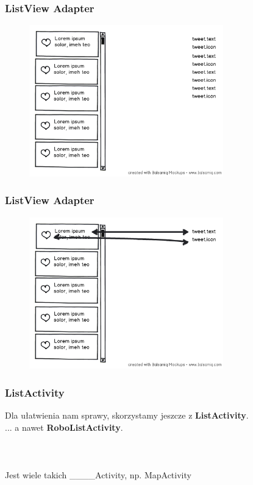 \begin{frame}\frametitle{ListView Adapter}
\begin{figure}
 \centering
 \includegraphics[width=0.75\textwidth]{images/adapter_1}
\end{figure}
\end{frame}

\begin{frame}\frametitle{ListView Adapter}
\begin{figure}
 \centering
 \includegraphics[width=0.75\textwidth]{images/adapter_2}
\end{figure}
\end{frame}

\begin{frame}\frametitle{ListActivity}
\begin{center}
 Dla ułatwienia nam sprawy, skorzystamy jeszcze z \textbf{ListActivity}.\\
 \pause ... a nawet \textbf{RoboListActivity}.\\
\ \\
\ \\
\ \\
\small{Jest wiele takich \_\_\_\_Activity, np. MapActivity }
\end{center}
\end{frame}

